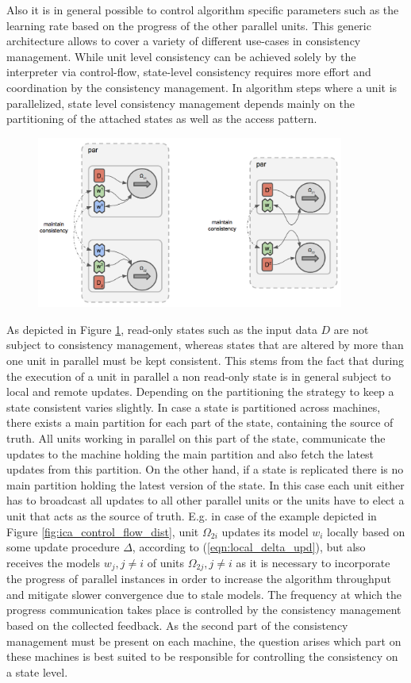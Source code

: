 Also it is in general possible to control algorithm specific parameters such as the learning rate based on the progress of the other parallel units.
This generic architecture allows to cover a variety of different use-cases in consistency management.
While unit level consistency can be achieved solely by the interpreter via control-flow, state-level consistency requires more effort and coordination by the consistency management.
In algorithm steps where a unit is parallelized, state level consistency management depends mainly on the partitioning of the attached states as well as the access pattern.
\begin{figure}[ht]
\centering
\includegraphics[width=0.9\textwidth]{img/par_repl_model.png}
\caption{}
\label{fig:par_repl_model}
\end{figure}
As depicted in Figure \ref{fig:par_repl_model}, read-only states such as the input data $D$ are not subject to consistency management, whereas states that are altered by more than one unit in parallel must be kept consistent.
This stems from the fact that during the execution of a unit in parallel a non read-only state is in general subject to local and remote updates.
Depending on the partitioning the strategy to keep a state consistent varies slightly.
In case a state is partitioned across machines, there exists a main partition for each part of the state, containing the source of truth.
All units working in parallel on this part of the state, communicate the updates to the machine holding the main partition and also fetch the latest updates from this partition.
On the other hand, if a state is replicated there is no main partition holding the latest version of the state.
In this case each unit either has to broadcast all updates to all other parallel units or the units have to elect a unit that acts as the source of truth.
E.g. in case of the example depicted in Figure \ref{fig:ica_control_flow_dist}, unit $\Omega_{2i}$ updates its model $w_i$ locally based on some update procedure $\Delta$, according to (\ref{eqn:local_delta_upd}), but also receives the models $w_j, j \neq i$ of units $\Omega_{2j}, j \neq i$ as it is necessary to incorporate the progress of parallel instances in order to increase the algorithm throughput and mitigate slower convergence due to stale models.
The frequency at which the progress communication takes place is controlled by the consistency management based on the collected feedback.
As the second part of the consistency management must be present on each machine, the question arises which part on these machines is best suited to be responsible for controlling the consistency on a state level.

